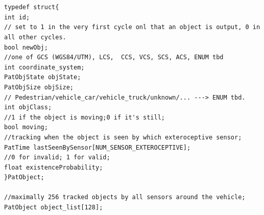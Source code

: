 \documentclass[12pt,a4paper]{article}
\newcommand{\zhiv}{\fontsize{12pt}{18pt}\selectfont}      %
\begin{document}
\section{\textbf{\song{\zhiv 附录}}}
\subsection{\textbf{\song{\zhiv 追踪列表（动态）}}}


\begin{verbatim}
typedef struct{
int id;
// set to 1 in the very first cycle onl that an object is output, 0 in all other cycles.
bool newObj;
//one of GCS (WGS84/UTM), LCS,  CCS, VCS, SCS, ACS, ENUM tbd
int coordinate_system;
PatObjState objState;
PatObjSize objSize;
// Pedestrian/vehicle_car/vehicle_truck/unknown/... ---> ENUM tbd.
int objClass;
//1 if the object is moving;0 if it's still;
bool moving;
//tracking when the object is seen by which exteroceptive sensor;
PatTime lastSeenBySensor[NUM_SENSOR_EXTEROCEPTIVE];
//0 for invalid; 1 for valid;
float existenceProbability;
}PatObject;

//maximally 256 tracked objects by all sensors around the vehicle;
PatObject object_list[128];
\end{verbatim}


{\subsection{\textbf{\song\zhiv{主控模型 m函数}}}}
\end{document}
